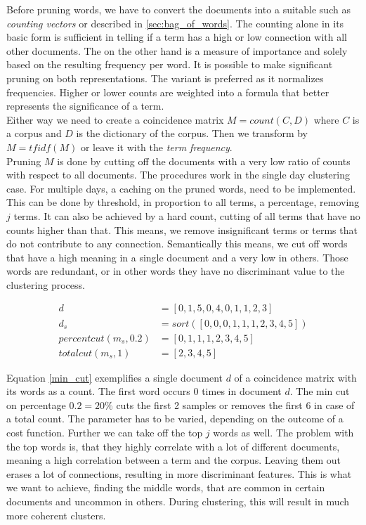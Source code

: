     Before pruning words, we have to convert the documents into a suitable \vsm{} such as \emph{counting vectors} or \tfidf{} described in \ref{sec:bag_of_words}. The counting alone in its basic form is sufficient in telling if a term has a high or low connection with all other documents. The \tfidf{} on the other hand is a measure of importance and solely based on the resulting frequency per word. It is possible to make significant pruning on both representations. The \tfidf{} variant is preferred as it normalizes frequencies. Higher or lower counts are weighted into a formula that better represents the significance of a term.\\

    Either way we need to create a coincidence matrix $M = count(C, D)$ where $C$ is a corpus and $D$ is the dictionary of the corpus. Then we transform by $M = tfidf(M)$ or leave it with the \emph{term frequency}.\\

    Pruning $M$ is done by cutting off the documents with a very low ratio of counts with respect to all documents. The procedures work in the single day clustering case. For multiple days, a caching on the pruned words, need to be implemented. This can be done by threshold, in proportion to all terms, a percentage, removing $j$ terms. It can also be achieved by a hard count, cutting of all terms that have no counts higher than that. This means, we remove insignificant terms or terms that do not contribute to any connection. Semantically this means, we cut off words that have a high meaning in a single document and a very low in others. Those words are redundant, or in other words they have no discriminant value to the clustering process.

      \begin{equation}\label{min_cut}
      \begin{split}
        d &= [0, 1, 5, 0, 4, 0, 1, 1, 2, 3] \\
        d_s &= sort( [0, 0, 0, 1, 1, 1, 2, 3, 4, 5] ) \\
        percentcut(m_s, 0.2) &= [0, 1, 1, 1, 2, 3, 4, 5] \\
        totalcut(m_s, 1) &= [2, 3, 4, 5]
      \end{split}
      \end{equation}

    Equation \ref{min_cut} exemplifies a single document $d$ of a coincidence matrix with its words as a count. The first word occurs 0 times in document $d$. The min cut on percentage $0.2 = 20\%$ cuts the first 2 samples or removes the first 6 in case of a total count. The parameter has to be varied, depending on the outcome of a cost function. Further we can take off the top $j$ words as well. The problem with the top words is, that they highly correlate with a lot of different documents, meaning a high correlation between a term and the corpus. Leaving them out erases a lot of connections, resulting in more discriminant features. This is what we want to achieve, finding the middle words, that are common in certain documents and uncommon in others. During clustering, this will result in much more coherent clusters.

